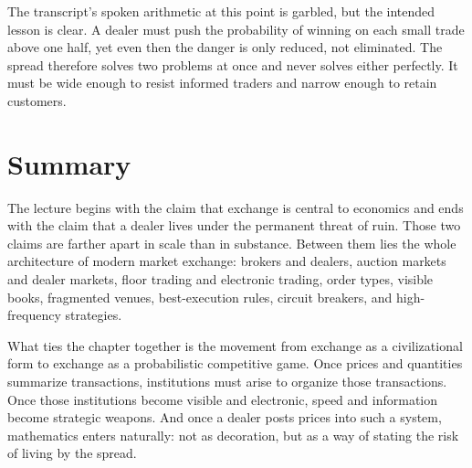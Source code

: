 The transcript's spoken arithmetic at this point is garbled, but the intended lesson is clear. A dealer must push the probability of winning on each small trade above one half, yet even then the danger is only reduced, not eliminated. The spread therefore solves two problems at once and never solves either perfectly. It must be wide enough to resist informed traders and narrow enough to retain customers.

\section{Summary}

The lecture begins with the claim that exchange is central to economics and ends with the claim that a dealer lives under the permanent threat of ruin. Those two claims are farther apart in scale than in substance. Between them lies the whole architecture of modern market exchange: brokers and dealers, auction markets and dealer markets, floor trading and electronic trading, order types, visible books, fragmented venues, best-execution rules, circuit breakers, and high-frequency strategies.

What ties the chapter together is the movement from exchange as a civilizational form to exchange as a probabilistic competitive game. Once prices and quantities summarize transactions, institutions must arise to organize those transactions. Once those institutions become visible and electronic, speed and information become strategic weapons. And once a dealer posts prices into such a system, mathematics enters naturally: not as decoration, but as a way of stating the risk of living by the spread.